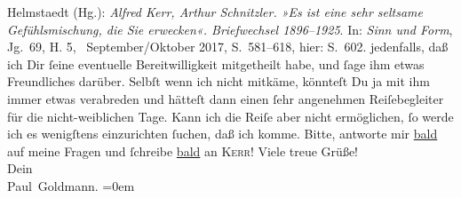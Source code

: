 \begin{ledgroupsized}[t]{13cm}
{{{                     Helmstaedt (Hg.): \emph{Alfred Kerr, Arthur Schnitzler. »Es ist eine
                        sehr seltsame Gefühlsmischung, die Sie erwecken«. Briefwechsel
                        1896–1925}. In: \emph{Sinn und Form}, Jg. 69, H. 5,
                         September/Oktober 2017, S. 581–618, hier:
                     S. 602.}}}\label{K_L02920-3h} jedenfalls, daß ich Dir ſeine eventuelle Bereitwilligkeit
               mitgetheilt habe, und  ſage ihm etwas Freundliches {\pb}darüber. Selbſt wenn ich nicht mitkäme, könnteſt Du
               ja mit ihm immer etwas
               verabreden und hätteſt dann einen ſehr angenehmen Reiſebegleiter für die
               nicht-weiblichen Tage.\pend
           \pstart
           Kann ich die Reiſe aber nicht ermöglichen, ſo werde ich es wenigſtens einzurichten
               ſuchen, daß ich \label{K_L02920-4v}\label{K_L02920-4h} komme.\pend
           \pstart
           Bitte, antworte mir \uline{bald} auf meine Fragen und
               ſchreibe \uline{bald} an \textsc{Kerr}!\pend
           \pstart
           Viele treue Grüße! {\\[\baselineskip]}Dein {\\[\baselineskip]}\spacefill\mbox{Paul Goldmann.}\pend
           \leftskip=0em{}
         
         \endnumbering{}\end{ledgroupsized}  \newcommand{\dateiname}{L02920}\newcommand{\titel}{Paul Goldmann an Arthur Schnitzler, 16. 6. [1900]}\newcommand{\editorInnen}{Martin Anton Müller und Laura Untner}
      